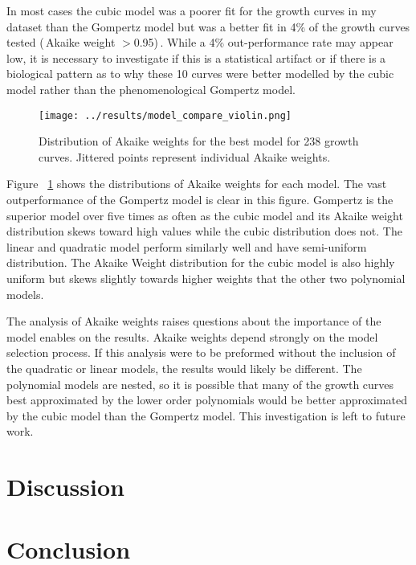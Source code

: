 \documentclass[11pt]{article}
\begin{document}
  In most cases the cubic model was a poorer fit for the growth curves in my dataset than the Gompertz model but was a better fit in 4\% of the growth curves tested (\,Akaike weight $>$0.95)\,. While a 4\% out-performance rate may appear low, it is necessary to investigate if this is a statistical artifact or if there is a biological pattern as to why these 10 curves were better modelled by the cubic model rather than the phenomenological Gompertz model. 

  \begin{figure}[!ht]
    \centering
    \texttt{[image: ../results/model\_compare\_violin.png]}
    \caption{Distribution of Akaike weights for the best model for 238 growth curves. Jittered points represent individual Akaike weights.}
    \label{violin}
   \end{figure}

  Figure ~\ref{violin} shows the distributions of Akaike weights for each model. The vast outperformance of the Gompertz model is clear in this figure. Gompertz is the superior model over five times as often as the cubic model and its Akaike weight distribution skews toward high values while the cubic distribution does not. The linear and quadratic model perform similarly well and have semi-uniform distribution. The Akaike Weight distribution for the cubic model is also highly uniform but skews slightly towards higher weights that the other two polynomial models. 

  The analysis of Akaike weights raises questions about the importance of the model enables on the results. Akaike weights depend strongly on the model selection process. If this analysis were to be preformed without the inclusion of the quadratic or linear models, the results would likely be different. The polynomial models are nested, so it is possible that many of the growth curves best approximated by the lower order polynomials would be better approximated by the cubic model than the Gompertz model. This investigation is left to future work.
  

  \section{Discussion}

  \section{Conclusion}

  
  
  
\end{document}
